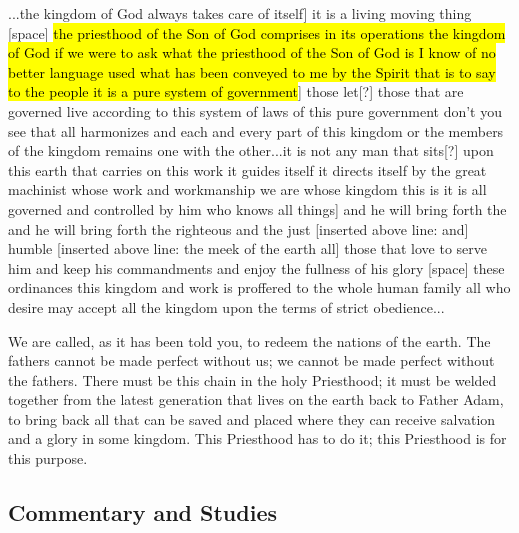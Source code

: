 \begin{compactdesc}
			\item[{\hyperref[EMS-1866-BY-17-JUN-1866]{17 June 1866}}] ...the kingdom of God always takes care of itself] it is a living moving thing [space] \hl{the priesthood of the Son of God comprises in its operations the kingdom of God if we were to ask what the priesthood of the Son of God is I know of no better language used what has been conveyed to me by the Spirit that is to say to the people it is a pure system of government}] those let[?] those that are governed live according to this system of laws of this pure government don't you see that all harmonizes and each and every part of this kingdom or the members of the kingdom remains one with the other...it is not any man that sits[?] upon this earth that carries on this work it guides itself it directs itself by the great machinist whose work and workmanship we are whose kingdom this is it is all governed and controlled by him who knows all things] and he will bring forth the and he will bring forth the righteous and the just [inserted above line: and] humble [inserted above line: the meek of the earth all] those that love to serve him and keep his commandments and enjoy the fullness of his glory [space] these ordinances this kingdom and work is proffered to the whole human family all who desire may accept all the kingdom upon the terms of strict obedience...
			\item[{\hyperref[EMS-1870-BY-30-OCT-1870]{30 October 1870}}] We are called, as it has been told you, to redeem the nations of the earth. The fathers cannot be made perfect without us; we cannot be made perfect without the fathers. There must be this chain in the holy Priesthood; it must be welded together from the latest generation that lives on the earth back to Father Adam, to bring back all that can be saved and placed where they can receive salvation and a glory in some kingdom. This Priesthood has to do it; this Priesthood is for this purpose.
		\end{compactdesc}
	
\subsection{Commentary and Studies} %
	\label{PRIESTHOOD-COMMENTARY}

	
